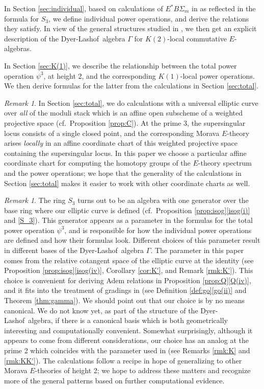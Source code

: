 \documentclass{gtpart}
\theoremstyle{definition}
\theoremstyle{remark}
\newtheorem{rmk}[thm]{Remark}
\newcommand{\DL}{Dyer-Lashof~}
\newcommand{\G}{\Gamma}
\newcommand{\p}{\psi^3}
\newcommand{\isog}[1]{Proposition \ref{prop:isog}\thinspace \eqref{isog(#1)}}
\newcommand{\q}[1]{Proposition \ref{prop:Q}\thinspace \eqref{Q(#1)}}
\newcommand{\go}[1]{Definition \ref{def:go}\thinspace \eqref{go(#1)}}
\begin{document}
In Section \ref{sec:individual}, based on calculations of 
$E^* B\Sigma_m$ in \cite{Str98} as reflected in the formula for $S_3$, 
we define individual power operations, and derive the relations they 
satisfy.  In view of the general structures studied in \cite{cong}, we 
then get an explicit description of the \DL algebra $\G$ for 
$K(2)$-local commutative $E$-algebras.  

In Section \ref{sec:K(1)}, we describe the relationship between the 
total power operation $\p$, at height 2, and the corresponding 
$K(1)$-local power operations.  We then derive formulas for the latter 
from the calculations in Section \ref{sec:total}.  

\begin{rmk}
\label{rmk:grading}
 In Section \ref{sec:total}, we do calculations with a universal 
 elliptic curve over {\em all} of the moduli stack which is an affine 
 open subscheme of a weighted projective space (cf.~Proposition 
 \ref{prop:C}).  At the prime 3, the supersingular locus consists of a 
 single closed point, and the corresponding Morava $E$-theory arises 
 {\em locally} in an affine coordinate chart of this weighted projective 
 space containing the supersingular locus.  In this paper we choose a 
 particular affine coordinate chart for computing the homotopy groups of 
 the $E$-theory spectrum and the power operations; we hope that the 
 generality of the calculations in Section \ref{sec:total} makes it 
 easier to work with other coordinate charts as well.  
\end{rmk}

\begin{rmk}
\label{rmk:parameter}
 The ring $S_3$ turns out to be an algebra with one generator over the 
 base ring where our elliptic curve is defined (cf.~\isog{i} and 
 \eqref{S_3}).  This generator appears as a parameter in the formulas 
 for the total power operation $\p$, and is responsible for how the 
 individual power operations are defined and how their formulas look.  
 Different choices of this parameter result in different bases of the 
 \DL algebra $\G$.  The parameter in this paper comes from the relative 
 cotangent space of the elliptic curve at the identity (see \isog{iv}, 
 Corollary \ref{cor:K'}, and Remark \ref{rmk:K'}).  This choice is 
 convenient for deriving Adem relations in \q{iv}, and it fits into the 
 treatment of gradings in \cite[Section 2]{cong} (see \go{ii} and 
 Theorem \ref{thm:gamma}).  We should point out that our choice is by no 
 means canonical.  We do not know yet, as part of the structure of the 
 \DL algebra, if there is a canonical basis which is both geometrically 
 interesting and computationally convenient.  Somewhat surprisingly, 
 although it appears to come from different considerations, our choice 
 has an analog at the prime 2 which coincides with the parameter used in 
 \cite{h2p2} (see Remarks \ref{rmk:K} and \ref{rmk:KK'}).  The 
 calculations follow a recipe in hope of generalizing to other Morava 
 $E$-theories of height 2; we hope to address these matters and 
 recognize more of the general patterns based on further computational 
 evidence.  
\end{rmk}
\end{document}
